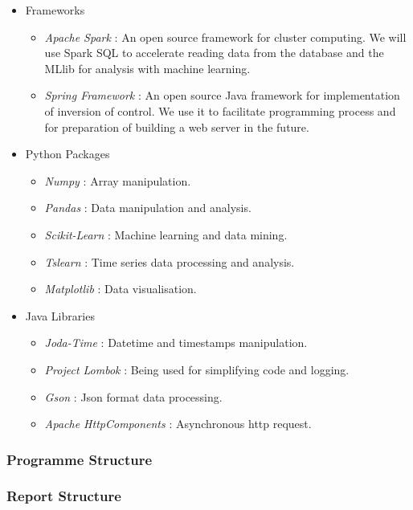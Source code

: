 \documentclass[11pt]{article} %
\theoremstyle{plain}
\theoremstyle{definition}
\begin{document}
\begin{itemize}
  \item Frameworks
  \begin{itemize}
    \item \textsl{Apache Spark}\cite{spark} : An open source framework for cluster computing. We will use Spark SQL to accelerate reading data from the database and the MLlib for analysis with machine learning.
    \item \textsl{Spring Framework}\cite{spring} : An open source Java framework for implementation of inversion of control. We use it to facilitate programming process and for preparation of building a web server in the future.
  \end{itemize}

  \item Python Packages
  \begin{itemize}
    \item \textsl{Numpy}\cite{scipy} : Array manipulation.
    \item \textsl{Pandas}\cite{scipy} : Data manipulation and analysis.
    \item \textsl{Scikit-Learn}\cite{scipy} : Machine learning and data mining.
    \item \textsl{Tslearn}\cite{tslearn} : Time series data processing and analysis.
    \item \textsl{Matplotlib}\cite{scipy} : Data visualisation.
  \end{itemize}

  \item Java Libraries
  \begin{itemize}
    \item \textsl{Joda-Time}\cite{jodatime} : Datetime and timestamps manipulation.
    \item \textsl{Project Lombok}\cite{lombok} : Being used for simplifying code and logging.
    \item \textsl{Gson}\cite{gson} : Json format data processing.
    \item \textsl{Apache HttpComponents}\cite{httpcomponents} : Asynchronous http request.
  \end{itemize}

\end{itemize}

\subsubsection{Programme Structure}
\subsubsection{Report Structure}
\end{document}
